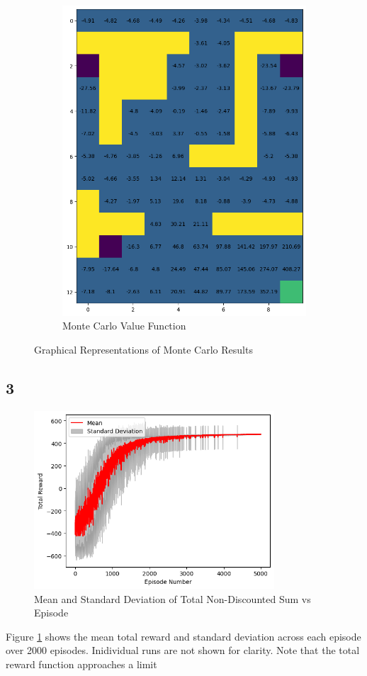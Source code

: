 \begin{figure}[H]
\begin{subfigure}[b]{0.4\textwidth}
        \includegraphics[width=\textwidth]{assets/mc/mc_value.png}        
        \caption{Monte Carlo Value Function}
    \end{subfigure}
    \caption*{Graphical Representations of Monte Carlo Results}
\end{figure} 

\subsection*{3}
\begin{figure}[H]
    \centering
    \includegraphics[width=0.8\textwidth]{assets/mc/mean_std_plot.png}
    \caption{Mean and Standard Deviation of Total Non-Discounted Sum vs Episode}
    \label{figure: total reward vs episode mc}
\end{figure} 

Figure \ref{figure: total reward vs episode mc} shows the mean
total reward and standard deviation across each episode over 2000
episodes. Inidividual runs are not shown for clarity. Note that
the total reward function approaches a limit %

